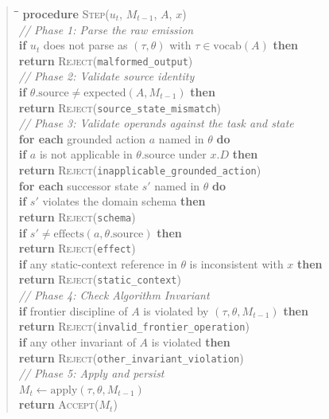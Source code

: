 \begin{quote}
\small
\begin{tabbing}
\hspace{1.5em}\=\hspace{1.5em}\=\hspace{1.5em}\=\kill
\textbf{procedure} \textsc{Step}($u_t$, $M_{t-1}$, $A$, $x$) \\
\> \textit{// Phase 1: Parse the raw emission} \\
\> \textbf{if} $u_t$ does not parse as $(\tau, \theta)$ with $\tau \in \mathrm{vocab}(A)$ \textbf{then} \\
\>\> \textbf{return} \textsc{Reject}(\texttt{malformed\_output}) \\[2pt]
\> \textit{// Phase 2: Validate source identity} \\
\> \textbf{if} $\theta.\mathrm{source} \neq \mathrm{expected}(A, M_{t-1})$ \textbf{then} \\
\>\> \textbf{return} \textsc{Reject}(\texttt{source\_state\_mismatch}) \\[2pt]
\> \textit{// Phase 3: Validate operands against the task and state} \\
\> \textbf{for each} grounded action $a$ named in $\theta$ \textbf{do} \\
\>\> \textbf{if} $a$ is not applicable in $\theta.\mathrm{source}$ under $x.D$ \textbf{then} \\
\>\>\> \textbf{return} \textsc{Reject}(\texttt{inapplicable\_grounded\_action}) \\
\> \textbf{for each} successor state $s'$ named in $\theta$ \textbf{do} \\
\>\> \textbf{if} $s'$ violates the domain schema \textbf{then} \\
\>\>\> \textbf{return} \textsc{Reject}(\texttt{schema}) \\
\>\> \textbf{if} $s' \neq \mathrm{effects}(a, \theta.\mathrm{source})$ \textbf{then} \\
\>\>\> \textbf{return} \textsc{Reject}(\texttt{effect}) \\
\> \textbf{if} any static-context reference in $\theta$ is inconsistent with $x$ \textbf{then} \\
\>\> \textbf{return} \textsc{Reject}(\texttt{static\_context}) \\[2pt]
\> \textit{// Phase 4: Check Algorithm Invariant} \\
\> \textbf{if} frontier discipline of $A$ is violated by $(\tau, \theta, M_{t-1})$ \textbf{then} \\
\>\> \textbf{return} \textsc{Reject}(\texttt{invalid\_frontier\_operation}) \\
\> \textbf{if} any other invariant of $A$ is violated \textbf{then} \\
\>\> \textbf{return} \textsc{Reject}(\texttt{other\_invariant\_violation}) \\[2pt]
\> \textit{// Phase 5: Apply and persist} \\
\> $M_t \leftarrow \mathrm{apply}(\tau, \theta, M_{t-1})$ \\
\> \textbf{return} \textsc{Accept}($M_t$)
\end{tabbing}
\end{quote}

